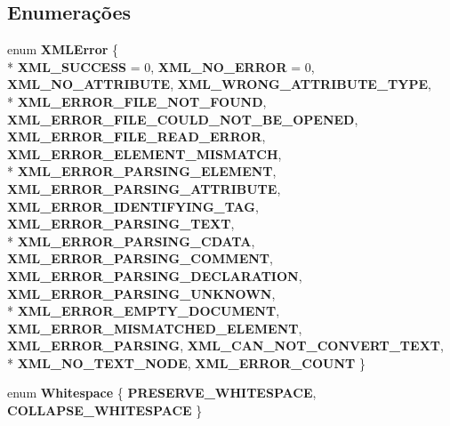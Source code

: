 \subsection*{Enumerações}
\begin{DoxyCompactItemize}
\item 
enum {\bf X\+M\+L\+Error} \{ \\*
{\bf X\+M\+L\+\_\+\+S\+U\+C\+C\+E\+SS} = 0, 
{\bf X\+M\+L\+\_\+\+N\+O\+\_\+\+E\+R\+R\+OR} = 0, 
{\bf X\+M\+L\+\_\+\+N\+O\+\_\+\+A\+T\+T\+R\+I\+B\+U\+TE}, 
{\bf X\+M\+L\+\_\+\+W\+R\+O\+N\+G\+\_\+\+A\+T\+T\+R\+I\+B\+U\+T\+E\+\_\+\+T\+Y\+PE}, 
\\*
{\bf X\+M\+L\+\_\+\+E\+R\+R\+O\+R\+\_\+\+F\+I\+L\+E\+\_\+\+N\+O\+T\+\_\+\+F\+O\+U\+ND}, 
{\bf X\+M\+L\+\_\+\+E\+R\+R\+O\+R\+\_\+\+F\+I\+L\+E\+\_\+\+C\+O\+U\+L\+D\+\_\+\+N\+O\+T\+\_\+\+B\+E\+\_\+\+O\+P\+E\+N\+ED}, 
{\bf X\+M\+L\+\_\+\+E\+R\+R\+O\+R\+\_\+\+F\+I\+L\+E\+\_\+\+R\+E\+A\+D\+\_\+\+E\+R\+R\+OR}, 
{\bf X\+M\+L\+\_\+\+E\+R\+R\+O\+R\+\_\+\+E\+L\+E\+M\+E\+N\+T\+\_\+\+M\+I\+S\+M\+A\+T\+CH}, 
\\*
{\bf X\+M\+L\+\_\+\+E\+R\+R\+O\+R\+\_\+\+P\+A\+R\+S\+I\+N\+G\+\_\+\+E\+L\+E\+M\+E\+NT}, 
{\bf X\+M\+L\+\_\+\+E\+R\+R\+O\+R\+\_\+\+P\+A\+R\+S\+I\+N\+G\+\_\+\+A\+T\+T\+R\+I\+B\+U\+TE}, 
{\bf X\+M\+L\+\_\+\+E\+R\+R\+O\+R\+\_\+\+I\+D\+E\+N\+T\+I\+F\+Y\+I\+N\+G\+\_\+\+T\+AG}, 
{\bf X\+M\+L\+\_\+\+E\+R\+R\+O\+R\+\_\+\+P\+A\+R\+S\+I\+N\+G\+\_\+\+T\+E\+XT}, 
\\*
{\bf X\+M\+L\+\_\+\+E\+R\+R\+O\+R\+\_\+\+P\+A\+R\+S\+I\+N\+G\+\_\+\+C\+D\+A\+TA}, 
{\bf X\+M\+L\+\_\+\+E\+R\+R\+O\+R\+\_\+\+P\+A\+R\+S\+I\+N\+G\+\_\+\+C\+O\+M\+M\+E\+NT}, 
{\bf X\+M\+L\+\_\+\+E\+R\+R\+O\+R\+\_\+\+P\+A\+R\+S\+I\+N\+G\+\_\+\+D\+E\+C\+L\+A\+R\+A\+T\+I\+ON}, 
{\bf X\+M\+L\+\_\+\+E\+R\+R\+O\+R\+\_\+\+P\+A\+R\+S\+I\+N\+G\+\_\+\+U\+N\+K\+N\+O\+WN}, 
\\*
{\bf X\+M\+L\+\_\+\+E\+R\+R\+O\+R\+\_\+\+E\+M\+P\+T\+Y\+\_\+\+D\+O\+C\+U\+M\+E\+NT}, 
{\bf X\+M\+L\+\_\+\+E\+R\+R\+O\+R\+\_\+\+M\+I\+S\+M\+A\+T\+C\+H\+E\+D\+\_\+\+E\+L\+E\+M\+E\+NT}, 
{\bf X\+M\+L\+\_\+\+E\+R\+R\+O\+R\+\_\+\+P\+A\+R\+S\+I\+NG}, 
{\bf X\+M\+L\+\_\+\+C\+A\+N\+\_\+\+N\+O\+T\+\_\+\+C\+O\+N\+V\+E\+R\+T\+\_\+\+T\+E\+XT}, 
\\*
{\bf X\+M\+L\+\_\+\+N\+O\+\_\+\+T\+E\+X\+T\+\_\+\+N\+O\+DE}, 
{\bf X\+M\+L\+\_\+\+E\+R\+R\+O\+R\+\_\+\+C\+O\+U\+NT}
 \}
\item 
enum {\bf Whitespace} \{ {\bf P\+R\+E\+S\+E\+R\+V\+E\+\_\+\+W\+H\+I\+T\+E\+S\+P\+A\+CE}, 
{\bf C\+O\+L\+L\+A\+P\+S\+E\+\_\+\+W\+H\+I\+T\+E\+S\+P\+A\+CE}
 \}
\end{DoxyCompactItemize}


